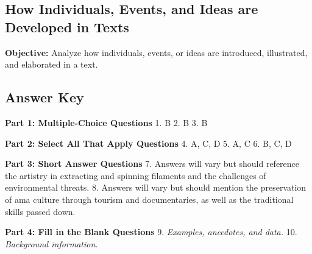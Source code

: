 \documentclass[12pt]{article}
\begin{document}
\subsection*{How Individuals, Events, and Ideas are Developed in Texts}
\onehalfspacing

\begin{tcolorbox}[colframe=black!40, colback=gray!0, title=Learning Objective]
\textbf{Objective:} Analyze how individuals, events, or ideas are introduced, illustrated, and elaborated in a text.
\end{tcolorbox}


\subsection*{Answer Key}
\textbf{Part 1: Multiple-Choice Questions}  
1. B  
2. B  
3. B  

\textbf{Part 2: Select All That Apply Questions}  
4. A, C, D  
5. A, C  
6. B, C, D  

\textbf{Part 3: Short Answer Questions}  
7. Answers will vary but should reference the artistry in extracting and spinning filaments and the challenges of environmental threats.  
8. Answers will vary but should mention the preservation of ama culture through tourism and documentaries, as well as the traditional skills passed down.  

\textbf{Part 4: Fill in the Blank Questions}  
9. \textit{Examples, anecdotes, and data.}  
10. \textit{Background information.}  
\end{document}
